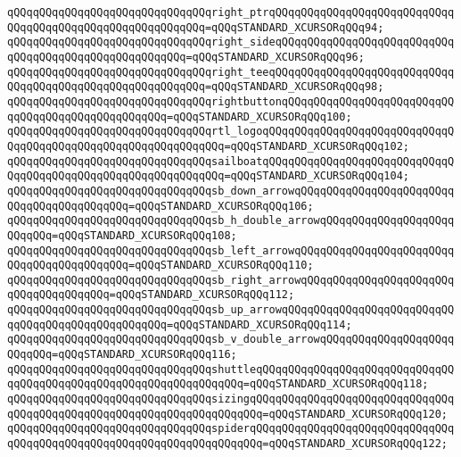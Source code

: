 \verb|qQQqqQQqqQQqqQQqqQQqqQQqqQQqqQQqright_ptrqQQqqQQqqQQqqQQqqQQqqQQqqQQqqQQqqQQqqQQqqQQqqQQqqQQqqQQqqQQq=qQQqSTANDARD_XCURSORqQQq94;|\newline
\verb|qQQqqQQqqQQqqQQqqQQqqQQqqQQqqQQqright_sideqQQqqQQqqQQqqQQqqQQqqQQqqQQqqQQqqQQqqQQqqQQqqQQqqQQqqQQq=qQQqSTANDARD_XCURSORqQQq96;|\newline
\verb|qQQqqQQqqQQqqQQqqQQqqQQqqQQqqQQqright_teeqQQqqQQqqQQqqQQqqQQqqQQqqQQqqQQqqQQqqQQqqQQqqQQqqQQqqQQqqQQq=qQQqSTANDARD_XCURSORqQQq98;|\newline
\verb|qQQqqQQqqQQqqQQqqQQqqQQqqQQqqQQqrightbuttonqQQqqQQqqQQqqQQqqQQqqQQqqQQqqQQqqQQqqQQqqQQqqQQqqQQq=qQQqSTANDARD_XCURSORqQQq100;|\newline
\verb|qQQqqQQqqQQqqQQqqQQqqQQqqQQqqQQqrtl_logoqQQqqQQqqQQqqQQqqQQqqQQqqQQqqQQqqQQqqQQqqQQqqQQqqQQqqQQqqQQqqQQq=qQQqSTANDARD_XCURSORqQQq102;|\newline
\verb|qQQqqQQqqQQqqQQqqQQqqQQqqQQqqQQqsailboatqQQqqQQqqQQqqQQqqQQqqQQqqQQqqQQqqQQqqQQqqQQqqQQqqQQqqQQqqQQqqQQq=qQQqSTANDARD_XCURSORqQQq104;|\newline
\verb|qQQqqQQqqQQqqQQqqQQqqQQqqQQqqQQqsb_down_arrowqQQqqQQqqQQqqQQqqQQqqQQqqQQqqQQqqQQqqQQqqQQq=qQQqSTANDARD_XCURSORqQQq106;|\newline
\verb|qQQqqQQqqQQqqQQqqQQqqQQqqQQqqQQqsb_h_double_arrowqQQqqQQqqQQqqQQqqQQqqQQqqQQq=qQQqSTANDARD_XCURSORqQQq108;|\newline
\verb|qQQqqQQqqQQqqQQqqQQqqQQqqQQqqQQqsb_left_arrowqQQqqQQqqQQqqQQqqQQqqQQqqQQqqQQqqQQqqQQqqQQq=qQQqSTANDARD_XCURSORqQQq110;|\newline
\verb|qQQqqQQqqQQqqQQqqQQqqQQqqQQqqQQqsb_right_arrowqQQqqQQqqQQqqQQqqQQqqQQqqQQqqQQqqQQqqQQq=qQQqSTANDARD_XCURSORqQQq112;|\newline
\verb|qQQqqQQqqQQqqQQqqQQqqQQqqQQqqQQqsb_up_arrowqQQqqQQqqQQqqQQqqQQqqQQqqQQqqQQqqQQqqQQqqQQqqQQqqQQq=qQQqSTANDARD_XCURSORqQQq114;|\newline
\verb|qQQqqQQqqQQqqQQqqQQqqQQqqQQqqQQqsb_v_double_arrowqQQqqQQqqQQqqQQqqQQqqQQqqQQq=qQQqSTANDARD_XCURSORqQQq116;|\newline
\verb|qQQqqQQqqQQqqQQqqQQqqQQqqQQqqQQqshuttleqQQqqQQqqQQqqQQqqQQqqQQqqQQqqQQqqQQqqQQqqQQqqQQqqQQqqQQqqQQqqQQqqQQq=qQQqSTANDARD_XCURSORqQQq118;|\newline
\verb|qQQqqQQqqQQqqQQqqQQqqQQqqQQqqQQqsizingqQQqqQQqqQQqqQQqqQQqqQQqqQQqqQQqqQQqqQQqqQQqqQQqqQQqqQQqqQQqqQQqqQQqqQQq=qQQqSTANDARD_XCURSORqQQq120;|\newline
\verb|qQQqqQQqqQQqqQQqqQQqqQQqqQQqqQQqspiderqQQqqQQqqQQqqQQqqQQqqQQqqQQqqQQqqQQqqQQqqQQqqQQqqQQqqQQqqQQqqQQqqQQqqQQq=qQQqSTANDARD_XCURSORqQQq122;|\newline
